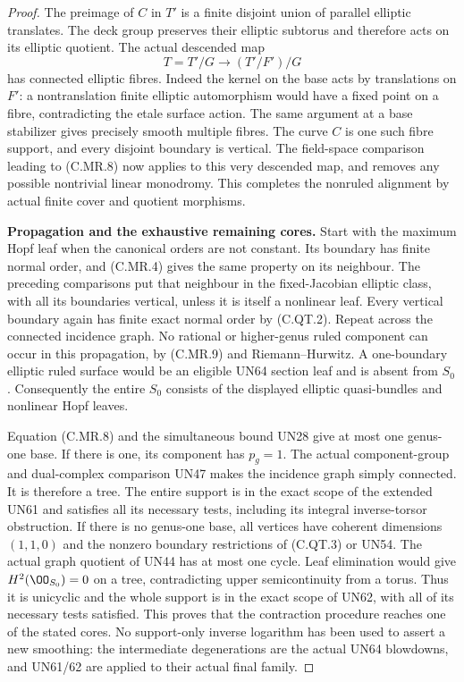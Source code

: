 \begin{proof}
The preimage of $C$ in $T'$ is
a finite disjoint union of
parallel elliptic translates.
The deck group preserves their
elliptic subtorus and therefore
acts on its elliptic quotient.
The actual descended map
\[
 T=T'/G\longrightarrow
                  (T'/F')/G
\tag{C.MR.14}
\]
has connected elliptic fibres.
Indeed the kernel on the base
acts by translations on $F'$:
a nontranslation finite elliptic
automorphism would have a fixed
point on a fibre, contradicting
the etale surface action.
The same argument at a base
stabilizer gives precisely
smooth multiple fibres.
The curve $C$ is one such
fibre support, and every
disjoint boundary is vertical.
The field-space comparison
leading to (C.MR.8) now applies
to this very descended map,
and removes any possible
nontrivial linear monodromy.
This completes the nonruled
alignment by actual finite
cover and quotient morphisms.

\par\medskip\noindent\textbf{Propagation and the exhaustive remaining cores.}
Start with the maximum Hopf
leaf when the canonical orders
are not constant. Its boundary
has finite normal order, and
(C.MR.4) gives the same property
on its neighbour. The preceding
comparisons put that neighbour
in the fixed-Jacobian elliptic
class, with all its boundaries
vertical, unless it is itself
a nonlinear leaf. Every vertical
boundary again has finite exact
normal order by (C.QT.2).
Repeat across the connected
incidence graph. No rational
or higher-genus ruled component
can occur in this propagation,
by (C.MR.9) and
Riemann--Hurwitz. A one-boundary
elliptic ruled surface would be
an eligible UN64 section leaf
and is absent from $S_0$.
Consequently the entire $S_0$
consists of the displayed
elliptic quasi-bundles and
nonlinear Hopf leaves.

Equation (C.MR.8) and the
simultaneous bound UN28 give
at most one genus-one base.
If there is one, its component
has $p_g=1$. The actual
component-group and dual-complex
comparison UN47 makes the
incidence graph simply connected.
It is therefore a tree. The
entire support is in the exact
scope of the extended UN61
and satisfies all its necessary
tests, including its integral
inverse-torsor obstruction.
If there is no genus-one base,
all vertices have coherent
dimensions $(1,1,0)$ and the
nonzero boundary restrictions
of (C.QT.3) or UN54.
The actual graph quotient of
UN44 has at most one cycle.
Leaf elimination would give
$H^2(\OO_{S_0})=0$ on a tree,
contradicting upper
semicontinuity from a torus.
Thus it is unicyclic and the
whole support is in the exact
scope of UN62, with all of
its necessary tests satisfied.
This proves that the
contraction procedure reaches
one of the stated cores.
No support-only inverse
logarithm has been used to
assert a new smoothing:
the intermediate degenerations
are the actual UN64 blowdowns,
and UN61/62 are applied to
their actual final family.


\end{proof}
